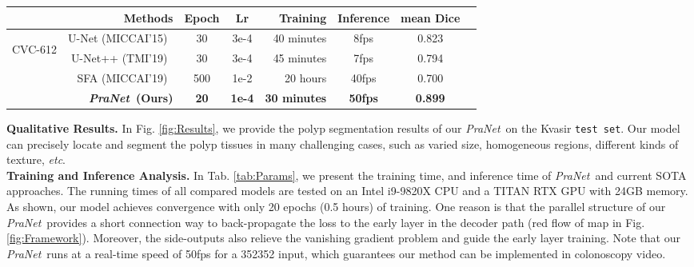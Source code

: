 \documentclass[runningheads]{llncs}
\newcommand{\figref}[1]{Fig. \ref{#1}}
\newcommand{\tabref}[1]{Tab. \ref{#1}}
\def\etc{\emph{etc}}
\def\ourmodel{\textit{PraNet}}
\begin{document}
\begin{table*}[t!]
  \centering
  \scriptsize
  \renewcommand{\arraystretch}{1.1}
  \setlength\tabcolsep{5.0pt}
  \caption{Training and inference analysis (same platform) on CVC-ClinicDB~\cite{bernal2015wm} dataset. We record the \#epochs when the model converges. Lr = learning rate.
  }\label{tab:Params}
  \begin{tabular}{cr||ccrccc}
  \hline
  \rowcolor{mygray}
   & Methods & Epoch & Lr & Training & Inference& mean Dice \\
\hline
  \multirow{4}{*}{\begin{sideways} CVC-612\end{sideways}} &
  U-Net (MICCAI'15)~\cite{ronneberger2015u} & 30 & 3e-4 & 40 minutes& 8fps & 0.823 \\
  & U-Net++ (TMI'19)~\cite{zhou2018unetplus} & 30 & 3e-4 & 45 minutes& 7fps & 0.794 \\
& SFA (MICCAI'19)~\cite{fang2019selective} & 500 & 1e-2 & 20 hours & 40fps & 0.700 \\
&\textbf{\ourmodel~(Ours)} & \textbf{20} & \textbf{1e-4} & \textbf{30 minutes} & \textbf{50fps}  & \textbf{0.899} \\
  \hline
  \end{tabular}
\end{table*}

\noindent\textbf{Qualitative Results.} In \figref{fig:Results}, we provide the polyp segmentation results of our \ourmodel~on the Kvasir {\tt test set}. Our model can precisely locate and segment the polyp tissues in many challenging cases, such as varied size, homogeneous regions, different kinds of texture, \etc.\\

\noindent\textbf{Training and Inference Analysis.} In \tabref{tab:Params}, we present the training time, and inference time of \ourmodel~and current SOTA approaches. 
The running times of all compared models are tested on an Intel i9-9820X CPU and a TITAN RTX GPU with 24GB memory.
As shown, our model achieves convergence with only 20 epochs (0.5 hours) of training. One reason is that the parallel structure of our \ourmodel~provides a short connection way to back-propagate the loss to the early layer in the decoder path (red flow of map in \figref{fig:Framework}). Moreover, the side-outputs also relieve the vanishing gradient problem and guide the early layer training. Note that our \ourmodel~runs at a real-time speed of 50fps for a 352352 input, which guarantees our method can be implemented in colonoscopy video.
\end{document}
